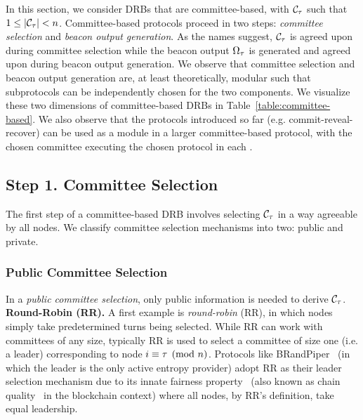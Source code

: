 In this section, we consider DRBs that are committee-based, with $\mathcal{C}_\tau$ such that $1 \leq |\mathcal{C}_\tau| < n$. Committee-based protocols proceed in two steps: \textit{committee selection} and \textit{beacon output generation}. As the names suggest, $\mathcal{C}_\tau$ is agreed upon during committee selection while the beacon output $\Omega_\tau$ is generated and agreed upon during beacon output generation.
We observe that committee selection and beacon output generation are, at least theoretically, modular such that subprotocols can be independently chosen for the two components. We visualize these two dimensions of committee-based DRBs in Table~\ref{table:committee-based}. We also observe that the protocols introduced so far (e.g. commit-reveal-recover) can be used as a module in a larger committee-based protocol, with the chosen committee executing the chosen protocol in each \epoch.

\subsection{Step 1. Committee Selection}
The first step of a committee-based DRB involves selecting $\mathcal{C}_\tau$ in a way agreeable by all nodes. We classify committee selection mechanisms into two: public and private.

\subsubsection{Public Committee Selection}
\label{subsubsection:public-committee-selection}
In a \textit{public committee selection}, only public information is needed to derive $\mathcal{C}_\tau$.\\

\noindent\textbf{Round-Robin (RR).} A first example is \textit{round-robin} (RR), in which nodes simply take predetermined turns being selected. While RR can work with committees of any size, typically RR is used to select a committee of size one (i.e. a leader) corresponding to node $i \equiv \tau \pmod n$. Protocols like BRandPiper~\cite{bhat2020randpiper} (in which the \epoch leader is the only active entropy provider) adopt RR as their leader selection mechanism due to its innate fairness property~\cite{azouvi2018winning} (also known as chain quality~\cite{garay2015bitcoin} in the blockchain context) where all nodes, by RR's definition, take equal leadership.\\

